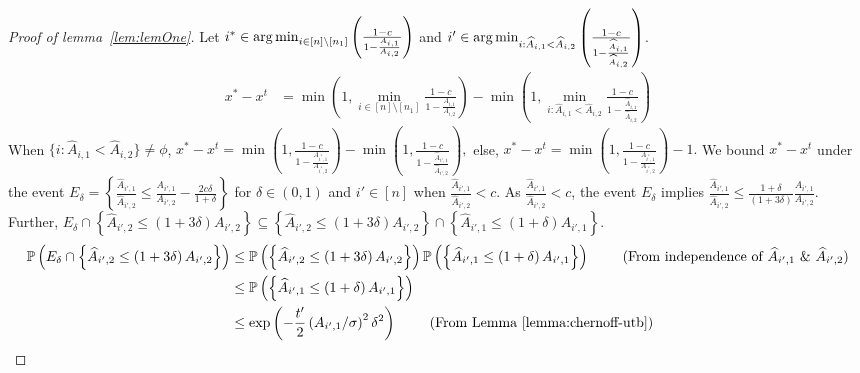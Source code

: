 \begin{proof}[Proof of lemma~\ref{lem:lemOne}]
Let $i^*\in \operatorname*{arg\,min}_{i \in [n] \setminus [n_1]}\left(\frac{1 - c}{ 1 - \frac{{A}_{i,1}}{{A}_{i,2}}}\right)$ and $i'\in \operatorname*{arg\,min}_{i :\widehat{A}_{i, 1}<\widehat{A}_{i, 2}}\left(\frac{1 - c}{ 1 - \frac{\widehat{A}_{i,1}}{\widehat{A}_{i,2}}}\right)$.
\begin{align*}
    x^*-x^t&= \min \left( 1,  \min_{i \in [n] \setminus [n_1]}\frac{1 - c}{ 1 - \frac{A_{i,1}}{A_{i,2}}} \right)-\min \left( 1, \min_{i:\widehat{A}_{i, 1}<\widehat{A}_{i, 2}} \frac{1 - c}{ 1 - \frac{\widehat{A}_{i,1}}{\widehat{A}_{i,2}}} \right)
\end{align*}
When $\{i: \widehat{A}_{i, 1}<\widehat{A}_{i, 2}\}\neq \phi$, $x^*-x^t = \min\left(1, \frac{1-c}{1-\frac{A_{i^*,1}}{{A_{i^*,2}}}}\right)
    - \min\left(1, \frac{1-c}{1-\frac{\widehat{A}_{i',1}}{{\widehat{A}_{i',2}}}}\right),$ else, $x^*-x^t=\min\left(1, \frac{1-c}{1-\frac{A_{i^*,1}}{{A_{i^*,2}}}}\right)
    - 1.$
\newline
We bound $x^*-x^t$ under the event $E_\delta=\left\{\frac{\widehat{A}_{i', 1}}{\widehat{A}_{i', 2}}\leq \frac{A_{i', 1}}{A_{i', 2}}-\frac{2c\delta}{1+\delta}\right\}$ for $\delta\in \left(0, 1\right)$ and $i'\in [n]$ when $\frac{\widehat{A}_{i', 1}}{\widehat{A}_{i', 2}}<c$. As $\frac{\widehat{A}_{i', 1}}{\widehat{A}_{i', 2}}<c$, the event $E_\delta$ implies $\frac{\widehat{A}_{i', 1}}{\widehat{A}_{i', 2}}\leq \frac{1+\delta}{(1+3\delta)}\frac{A_{i', 1}}{A_{i', 2}}$.
Further, $E_\delta \cap \left\{ \widehat{A}_{i', 2} \leq  \left(1+3\delta \right)A_{i', 2} \right\}\subseteq \left\{ \widehat{A}_{i', 2} \leq  \left(1+3\delta \right)A_{i', 2} \right\}\cap \left\{ \widehat{A}_{i', 1} \leq  \left(1+\delta \right)A_{i', 1} \right\}.$
\begin{align*}
    \mathbb{P}\left(E_\delta \cap \left\{ \widehat{A}_{i', 2} \leq  \left(1+3\delta \right)A_{i', 2} \right\}\right) 
    &\leq \mathbb{P}\left(\left\{ \widehat{A}_{i', 2} \leq  \left(1+3\delta \right)A_{i', 2} \right\}\right) \mathbb{P}\left(\left\{ \widehat{A}_{i', 1} \leq  \left(1+\delta \right)A_{i', 1} \right\}\right) \ \tag{From independence of $\widehat{A}_{i', 1} \ \& \ \widehat{A}_{i', 2}$} \\
    &\leq \mathbb{P}\left(\left\{ \widehat{A}_{i', 1} \leq  \left(1+\delta \right)A_{i', 1} \right\}\right)  \\
    &\leq \exp\left( -\frac{t'}{2}\left(A_{i', 1}/\sigma\right)^2\delta^2 \right) \ \tag{From Lemma~\ref{lemma:chernoff-utb}}
\end{align*}

\end{proof}
